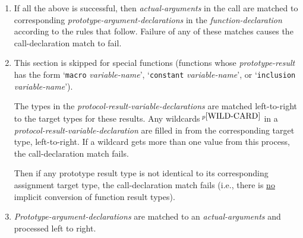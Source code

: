 \documentclass[12pt]{article}
\newcommand{\pagref}[1]{p\pageref{#1}}
\newcommand{\pagnote}[1]{$\,^{p\pageref{#1}}$}
\begin{document}
\begin{enumerate}
A {\em call-term} {\em argument-list} with implied parentheses
is treated as if it had {\tt (~)} parentheses.

If in a left-to-right scan of a {\em call-term},
a {\em call-argument-list} with {\tt (~)} is expected but instead
the end of the {\em call-term} is found,
an empty list {\tt ()} is appended to the {\em call-term}.

If a {\em call-argument-list} is shorter than the
corresponding {\em pattern-argument-list}, and all omitted
arguments at the end of the {\em call-argument-list} have {\em default-values}
in the {\em pattern-argument-list}, the {\em default-values} corresponding
to the omitted arguments are added to
the end of the {\em call-argument-list}.
The {\em default-values} are compiled in the context of the
{\em function-declaration} and not the context of the {\em function-call}:
see \pagref{DEFAULT-CONTEXT}.

At this point the {\em pattern-argument-lists} in the prototype
{\em pattern-term} must match in order all the {\em call-argument-lists}
in the {\em call-term} in number
of arguments, else the call-declaration match fails.

\item If all the above is successful, then {\em actual-arguments}
in the call are matched to corresponding {\em prototype-argument-declarations}
in the {\em function-declaration} according to the rules that follow.
Failure of any of these matches causes
the call-declaration match to fail.

\item\label{CALL-DECLARATION-TARGET-MATCHING}
This section is skipped for special functions (functions whose
{\em prototype-result} has the form `{\tt macro} {\em variable-name}',
`{\tt constant} {\em variable-name}', or
`{\tt inclusion} {\em variable-name}').

The types in the {\em protocol-result-variable-declarations} are
matched left-to-right to the target types for these results.
Any wildcards\pagnote{WILD-CARD} in a
{\em protocol-result-variable-declaration}
are filled in from the corresponding target type, left-to-right.
If a wildcard gets more
than one value from this process, the call-declaration match fails.

Then if any prototype result type is not identical to its corresponding
assignment target type, the call-declaration match fails
(i.e., there is \underline{no} implicit conversion of function result
types).

\item\label{CALL-DECLARATION-ARGUMENT-MATCHING}
{\em Prototype-argument-declarations} are matched to
an {\em actual-arguments} and processed left to right.


\end{enumerate}
\end{document}
